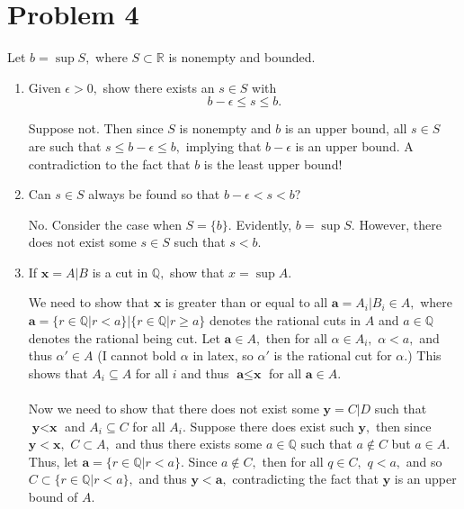 \documentclass[11pt]{article}
\newcommand{\bbQ}{\mathbb{Q}}
\newcommand{\bbR}{\mathbb{R}}
\begin{document}
\section*{Problem 4}
\begin{problem}
Let $b = \sup S,$ where $S\subset \bbR$ is nonempty and bounded.     
\end{problem}
\begin{enumerate}
    \item 
    \begin{problem}
        Given $\epsilon>0,$ show there exists an $s\in S$ with 
        \[b-\epsilon \leq s \leq b.\]
    \end{problem}
    \begin{solution}
        Suppose not. Then since $S$ is nonempty and $b$ is an upper bound, all $s\in S$ are such that $s\leq b-\epsilon \leq b,$ implying that $b-\epsilon$ is an upper bound. A contradiction to the fact that $b$ is the least upper bound!
    \end{solution}
    \item
    \begin{problem}
        Can $s\in S$ always be found so that $b-\epsilon < s< b?$
    \end{problem}
    \begin{solution}
        No. Consider the case when $S = \{b\}.$ Evidently, $b = \sup S.$ However, there does not exist some $s\in S$ such that $s<b.$
    \end{solution}
    \item 
    \begin{problem}
        If $\textbf{x} = A | B$ is a cut in $\bbQ,$ show that $x = \sup A.$
    \end{problem}
    \begin{solution}
        We need to show that $\textbf{x}$ is greater than or equal to all $\textbf{a} = A_i | B_i\in A,$ where $\textbf{a} = \{r\in \bbQ | r<a\} | \{r\in \bbQ | r\geq a\}$ denotes the rational cuts in $A$ and $a\in \bbQ$ denotes the rational being cut. Let $\textbf{a}\in A,$ then for all $\alpha \in A_i,$ $\alpha<a,$ and thus $\alpha' \in A$ (I cannot bold $\alpha$ in latex, so $\alpha'$ is the rational cut for $\alpha.$) This shows that $A_i \subseteq A$ for all $i$ and thus $\textbf{a}\leq \textbf{x}$ for all $\textbf{a}\in A.$\\\\
        Now we need to show that there does not exist some $\textbf{y} = C | D$ such that $\textbf{y}<\textbf{x}$ and $A_i \subseteq C$ for all $A_i.$ Suppose there does exist such $\textbf{y},$ then since $\textbf{y} < \textbf{x},$ $C \subset A,$ and thus there exists some $a\in \bbQ$ such that $a\notin C$ but $a\in A.$ Thus, let $\textbf{a} = \{r\in \bbQ | r<a\}.$ Since $a\notin C,$ then for all $q\in C,$ $q< a,$ and so $C\subset \{r\in \bbQ  | r<a\},$ and thus $\textbf{y}< \textbf{a},$ contradicting the fact that $\textbf{y}$ is an upper bound of $A.$
    \end{solution}
\end{enumerate}
\newpage
\end{document}
